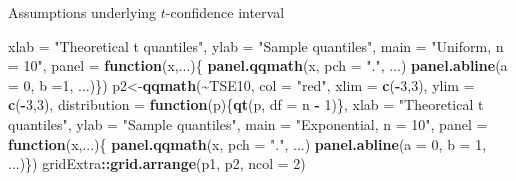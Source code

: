 \documentclass[
  ignorenonframetext,
]{beamer}
\newenvironment{Shaded}{\begin{snugshade}}{\end{snugshade}}
\newcommand{\AttributeTok}[1]{\textcolor[rgb]{0.13,0.29,0.53}{#1}}
\newcommand{\ControlFlowTok}[1]{\textcolor[rgb]{0.13,0.29,0.53}{\textbf{#1}}}
\newcommand{\DecValTok}[1]{\textcolor[rgb]{0.00,0.00,0.81}{#1}}
\newcommand{\FunctionTok}[1]{\textcolor[rgb]{0.13,0.29,0.53}{\textbf{#1}}}
\newcommand{\NormalTok}[1]{#1}
\newcommand{\OtherTok}[1]{\textcolor[rgb]{0.56,0.35,0.01}{#1}}
\newcommand{\SpecialCharTok}[1]{\textcolor[rgb]{0.81,0.36,0.00}{\textbf{#1}}}
\newcommand{\StringTok}[1]{\textcolor[rgb]{0.31,0.60,0.02}{#1}}
\begin{document}
\begin{frame}[fragile]{Assumptions underlying \(t\)-confidence interval}
\begin{Shaded}
\begin{Highlighting}[]
       \AttributeTok{xlab =} \StringTok{"Theoretical t quantiles"}\NormalTok{, }\AttributeTok{ylab =} \StringTok{"Sample quantiles"}\NormalTok{, }\AttributeTok{main =} \StringTok{"Uniform, n = 10"}\NormalTok{, }
       \AttributeTok{panel =} \ControlFlowTok{function}\NormalTok{(x,...)\{}
  \FunctionTok{panel.qqmath}\NormalTok{(x, }\AttributeTok{pch =} \StringTok{"."}\NormalTok{, ...)}
  \FunctionTok{panel.abline}\NormalTok{(}\AttributeTok{a =} \DecValTok{0}\NormalTok{, }\AttributeTok{b =}\DecValTok{1}\NormalTok{, ...)\})}
\NormalTok{p2}\OtherTok{\textless{}{-}}\FunctionTok{qqmath}\NormalTok{(}\SpecialCharTok{\textasciitilde{}}\NormalTok{TSE10, }\AttributeTok{col =} \StringTok{"red"}\NormalTok{, }\AttributeTok{xlim =} \FunctionTok{c}\NormalTok{(}\SpecialCharTok{{-}}\DecValTok{3}\NormalTok{,}\DecValTok{3}\NormalTok{), }\AttributeTok{ylim =} \FunctionTok{c}\NormalTok{(}\SpecialCharTok{{-}}\DecValTok{3}\NormalTok{,}\DecValTok{3}\NormalTok{), }\AttributeTok{distribution =} \ControlFlowTok{function}\NormalTok{(p)\{}\FunctionTok{qt}\NormalTok{(p, }\AttributeTok{df =}\NormalTok{ n }\SpecialCharTok{{-}} \DecValTok{1}\NormalTok{)\}, }
       \AttributeTok{xlab =} \StringTok{"Theoretical t quantiles"}\NormalTok{, }\AttributeTok{ylab =} \StringTok{"Sample quantiles"}\NormalTok{, }\AttributeTok{main =} \StringTok{"Exponential, n = 10"}\NormalTok{, }
       \AttributeTok{panel =} \ControlFlowTok{function}\NormalTok{(x,...)\{}
  \FunctionTok{panel.qqmath}\NormalTok{(x, }\AttributeTok{pch =} \StringTok{"."}\NormalTok{, ...)}
  \FunctionTok{panel.abline}\NormalTok{(}\AttributeTok{a =} \DecValTok{0}\NormalTok{, }\AttributeTok{b =} \DecValTok{1}\NormalTok{, ...)\})}
\NormalTok{gridExtra}\SpecialCharTok{::}\FunctionTok{grid.arrange}\NormalTok{(p1, p2, }\AttributeTok{ncol =} \DecValTok{2}\NormalTok{)}
\end{Highlighting}
\end{Shaded}

\normalsize
\end{frame}
\end{document}
